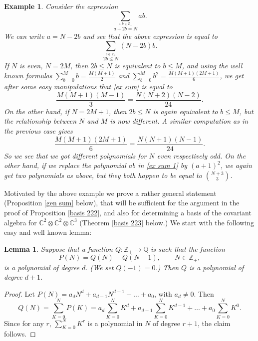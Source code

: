 \documentclass[reqno,11pt]{amsart}
\newtheorem{ex}[equation]{Example}
\newtheorem{lem}[equation]{Lemma}
\theoremstyle{remark}
\theoremstyle{definition}
\numberwithin{equation}{section}
\newcommand\ot{\otimes}
\newcommand{\pf}{\begin{proof}}
\newcommand{\epf}{\end{proof}}
\newcommand{\eq}{\begin{equation}}
\newcommand{\eeq}{\end{equation}}
\newcommand{\bbC}{\mathbb{C}}
\newcommand{\bbQ}{\mathbb{Q}}
\newcommand{\bbZ}{\mathbb{Z}}
\begin{document}
\begin{ex}
{\rm 
Consider the expression
\eq\label{ex sum 1}
\sum_{\overset{a,b\in\bbZ_+}{a+2b=N}} ab.
\eeq	
We can write $a=N-2b$ and see that the above expression is equal to
\eq\label{ex sum}
\sum_{\overset{b\in\bbZ_+}{2b\leq N}} (N-2b)b.
\eeq
If $N$ is even, $N=2M$, then $2b\leq N$ is equivalent to $b\leq M$, and using the well known formulas $\sum_{b=0}^M b=\frac{M(M+1)}{2}$ and $\sum_{b=0}^M b^2=\frac{M(M+1)(2M+1)}{6}$, we get after some easy manipulations that \eqref{ex sum} is equal to 
\[
\frac{M(M+1)(M-1)}{3}=\frac{N(N+2)(N-2)}{24}.
\]
On the other hand, if $N=2M+1$, then $2b\leq N$ is again equivalent to $b\leq M$, but the relationship between $N$ and $M$ is now different. A similar computation as in the previous case gives
\[
\frac{M(M+1)(2M+1)}{6}=\frac{N(N+1)(N-1)}{24}.
\]
So we see that we got different polynomials for $N$ even respectively odd. On the other hand, if we replace the polynomial $ab$ in \eqref{ex sum 1} by $(a+1)^2$, we again get two polynomials as above, but they both happen to be equal to $\binom{N+3}{3}$.
}
\end{ex}

Motivated by the above example we prove a rather general statement (Proposition \ref{gen sum} below), that will be sufficient for the argument in the proof of Proposition \ref{basis 222}, and also for determining a basis of the covariant algebra for $\bbC^2\ot\bbC^2\ot\bbC^3$ (Theorem \ref{basis 223} below.) We start with the following easy and well known lemma:

\begin{lem}\label{lemma poly} 
Suppose that a function $Q:\bbZ_+\to \bbQ$ is such that the function 
\[
P(N)=Q(N)-Q(N-1),\qquad N\in\bbZ_+,
\] 
is a polynomial of degree $d$. (We set $Q(-1)=0$.) Then $Q$ is a polynomial of degree $d+1$.
\end{lem} 
\pf
Let $P(N)=a_dN^d+a_{d-1}N^{d-1}+\dots + a_0$, with $a_d\neq 0$. Then
\[
Q(N)=\sum_{K=0}^N P(K)=a_d\sum_{K=0}^N K^d  +a_{d-1}\sum_{K=0}^N K^{d-1}+\dots+ a_0\sum_{K=0}^N K^0.
\] 
Since for any $r$, $\sum_{K=0}^N K^r$ is a polynomial in $N$ of degree $r+1$, the claim follows.
\epf
\end{document}
